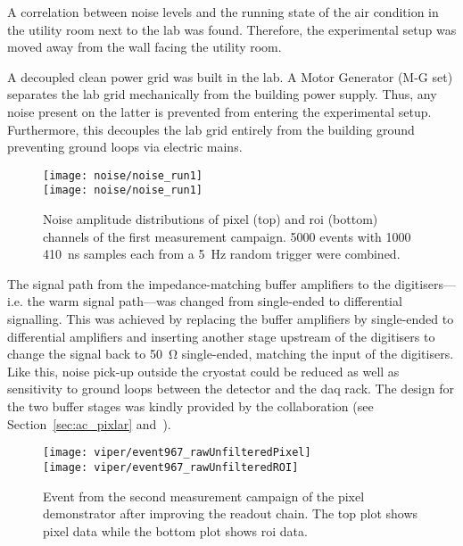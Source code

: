 A correlation between noise levels and the running state of the air condition in the utility room next to the lab was found.
Therefore, the experimental setup was moved away from the wall facing the utility room.

A decoupled clean power grid was built in the lab.
A Motor Generator (M-G set) separates the lab grid mechanically from the building power supply.
Thus, any noise present on the latter is prevented from entering the experimental setup.
Furthermore, this decouples the lab grid entirely from the building ground preventing ground loops via electric mains.

\begin{figure}[htb]
	\centering
	\texttt{[image: noise/noise\_run1]} \\
	\texttt{[image: noise/noise\_run1]}
	\caption[Noise distributions from first pixel demonstrator measurement campaign]{%
		Noise amplitude distributions of pixel (top) and \acrshort{roi} (bottom) channels of the first measurement campaign.
		\num{5000} events with \num{1000} \SI{410}{\nano\second} samples each from a \SI{5}{\hertz} random trigger were combined.
	}
	\label{fig:electronics_noise-run1}
\end{figure}

The signal path from the impedance-matching buffer amplifiers to the digitisers---i.e. the warm signal path---was changed from single-ended to differential signalling.
This was achieved by replacing the buffer amplifiers by single-ended to differential amplifiers and inserting another stage upstream of the digitisers to change the signal back to \SI{50}{\ohm} single-ended, matching the input of the digitisers.
Like this, noise pick-up outside the cryostat could be reduced as well as sensitivity to ground loops between the detector and the \gls{daq} rack.
The design for the two buffer stages was kindly provided by the \lariat{} collaboration (see Section~\ref{sec:ac_pixlar} and~\cite{lariat}).

\begin{figure}[htb]
	\centering
	\texttt{[image: viper/event967\_rawUnfilteredPixel]}\\
	\texttt{[image: viper/event967\_rawUnfilteredROI]}
	\caption[Event from second pixel demonstrator measurement campaign]{%
		Event from the second measurement campaign of the pixel demonstrator after improving the readout chain.
		The top plot shows pixel data while the bottom plot shows \acrshort{roi} data.
	}
	\label{fig:electronics_event-run2}
\end{figure}

